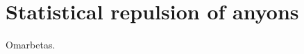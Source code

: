 \documentclass[a4paper,10pt,oneside]{book}
\theoremstyle{plain}
\theoremstyle{definition}
\theoremstyle{remark}
\DeclarePairedDelimiter\abs{\lvert}{\rvert}
\begin{document}
\chapter{Statistical repulsion of anyons}\label{chap:statistical repulsion}

\cite{lundholm-solovej,mancarella}

Omarbetas.




\end{document}

